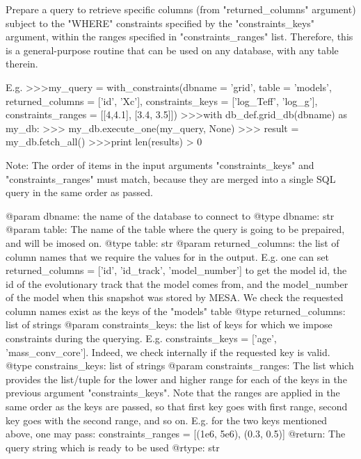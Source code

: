 \begin{DoxyVerb}Prepare a query to retrieve specific columns (from "returned_columns" argument) subject to the 
"WHERE" constraints specified by the "constraints_keys" argument, within the ranges specified in
"constraints_ranges" list. Therefore, this is a general-purpose routine that can be used on any 
database, with any table therein.

E.g. 
>>>my_query = with_constraints(dbname = 'grid', table = 'models',
                      returned_columns = ['id', 'Xc'], 
                      constraints_keys = ['log_Teff', 'log_g'], 
                      constraints_ranges = [[4,4.1], [3.4, 3.5]])
>>>with db_def.grid_db(dbname) as my_db: 
>>>  my_db.execute_one(my_query, None)
>>>  result = my_db.fetch_all()
>>>print len(results) > 0

Note: The order of items in the input arguments "constraints_keys" and "constraints_ranges" must 
match, because they are merged into a single SQL query in the same order as passed.

@param dbname: the name of the database to connect to
@type dbname: str
@param table: The name of the table where the query is going to be prepaired, and will be imosed on.
@type table: str
@param returned_columns: the list of column names that we require the values for in the output.
       E.g. one can set returned_columns = ['id', 'id_track', 'model_number'] to get the model id,
       the id of the evolutionary track that the model comes from, and the model_number of the model
       when this snapshot was stored by MESA. We check the requested column names exist as the 
       keys of the "models" table
@type returned_columns: list of strings
@param constraints_keys: the list of keys for which we impose constraints during the querying.
       E.g. constraints_keys = ['age', 'mass_conv_core']. Indeed, we check internally if the requested
       key is valid.
@type constrains_keys: list of strings   
@param constraints_ranges: The list which provides the list/tuple for the lower and higher range
       for each of the keys in the previous argument "constraints_keys". Note that the ranges are
       applied in the same order as the keys are passed, so that first key goes with first range,
       second key goes with the second range, and so on.
       E.g. for the two keys mentioned above, one may pass: 
       constraints_ranges = [(1e6, 5e6), (0.3, 0.5)]
@return: The query string which is ready to be used
@rtype: str
\end{DoxyVerb}
 

